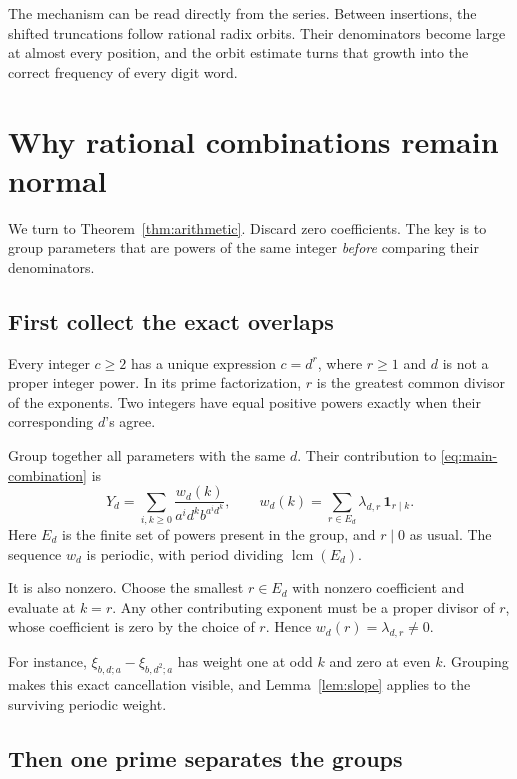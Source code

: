 \documentclass[11pt]{article}
\DeclareMathOperator{\lcm}{lcm}
\begin{document}
The mechanism can be read directly from the series. Between insertions,
the shifted truncations follow rational radix orbits. Their denominators
become large at almost every position, and the orbit estimate turns
that growth into the correct frequency of every digit word.

\section{Why rational combinations remain normal}

We turn to Theorem~\ref{thm:arithmetic}. Discard zero coefficients.
The key is to group parameters that are powers of the same integer
\emph{before} comparing their denominators.

\subsection*{First collect the exact overlaps}

Every integer \(c\ge2\) has a unique expression
\(c=d^r\), where \(r\ge1\) and \(d\) is not a proper integer
power. In its prime factorization, \(r\) is the greatest common
divisor of the exponents. Two integers have equal positive powers
exactly when their corresponding \(d\)'s agree.

Group together all parameters with the same \(d\). Their contribution
to \eqref{eq:main-combination} is
\begin{equation}\label{eq:grouping}
 Y_d=\sum_{i,k\ge0}\frac{w_d(k)}{a^i d^k b^{a^i d^k}},
 \qquad
 w_d(k)=\sum_{r\in E_d}\lambda_{d,r}\,\mathbf1_{r\mid k}.
\end{equation}
Here \(E_d\) is the finite set of powers present in the group, and
\(r\mid0\) as usual. The sequence \(w_d\) is periodic, with period
dividing \(\lcm(E_d)\).

It is also nonzero. Choose the smallest \(r\in E_d\) with nonzero
coefficient and evaluate at \(k=r\). Any other contributing exponent
must be a proper divisor of \(r\), whose coefficient is zero by the
choice of \(r\). Hence \(w_d(r)=\lambda_{d,r}\ne0\).

For instance, \(\xi_{b,d;a}-\xi_{b,d^2;a}\) has weight one at odd
\(k\) and zero at even \(k\). Grouping makes this exact cancellation
visible, and Lemma~\ref{lem:slope} applies to the surviving periodic
weight.

\subsection*{Then one prime separates the groups}
\end{document}
